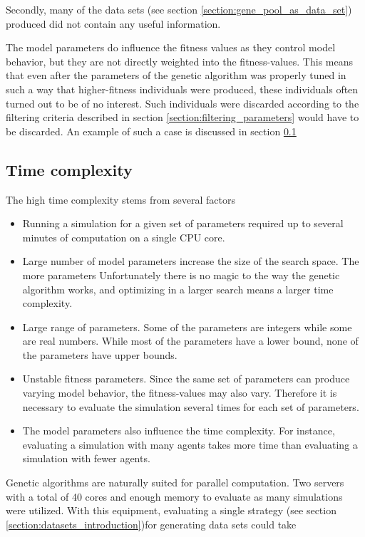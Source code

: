 Secondly, many of the data sets (see section \ref{section:gene_pool_as_data_set}) produced did not contain any useful information. 

The model parameters do influence the fitness values as they control model behavior, but they are not directly weighted into the fitness-values. This means that even after the parameters of the genetic algorithm was properly tuned in such a way that higher-fitness individuals were produced, these individuals often turned out to be of no interest. Such individuals were discarded according to the filtering criteria described in section \ref{section:filtering_parameters} would have to be discarded. An example of such a case is discussed in section \ref{}

\subsection{Time complexity}
The high time complexity stems from several factors
\begin{itemize}
\item Running a simulation for a given set of parameters required up to several minutes of computation on a single CPU core.
\item Large number of model parameters increase the size of the search space. The more parameters Unfortunately there is no magic to the way the genetic algorithm works, and optimizing in a larger search means a larger time complexity.
\item Large range of parameters. Some of the parameters are integers while some are real numbers. While most of the parameters have a lower bound, none of the parameters have upper bounds.
\item Unstable fitness parameters. Since the same set of parameters can produce varying model behavior, the fitness-values may also vary. Therefore it is necessary to evaluate the simulation several times for each set of parameters. 
\item The model parameters also influence the time complexity. For instance, evaluating a simulation with many agents takes more time than evaluating a simulation with fewer agents. 
\end{itemize}

Genetic algorithms are naturally suited for parallel computation. Two servers with a total of 40 cores and enough memory to evaluate as many simulations were utilized. With this equipment, evaluating a single strategy (see section \ref{section:datasets_introduction})for generating data sets could take 

